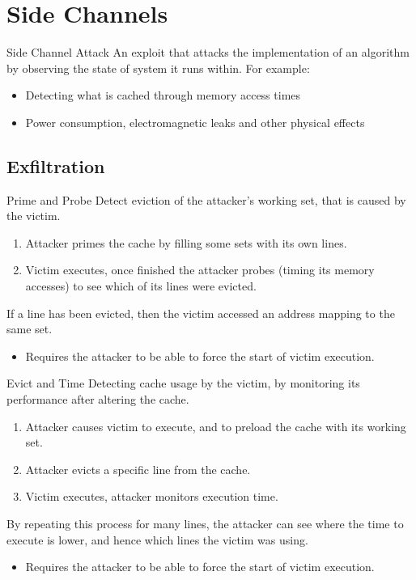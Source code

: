 \chapter{Side Channels}

\begin{definitionbox}{Side Channel Attack}
	An exploit that attacks the implementation of an algorithm by observing the state of system it runs within. For example:
	\begin{itemize}
		\item Detecting what is cached through memory access times
		\item Power consumption, electromagnetic leaks and other physical effects
	\end{itemize}
\end{definitionbox}

\section{Exfiltration}

\begin{definitionbox}{Prime and Probe}
	Detect eviction of the attacker's working set, that is caused by the victim.
	\begin{enumerate}
		\item Attacker primes the cache by filling some sets with its own lines.
		\item Victim executes, once finished the attacker probes (timing its memory accesses) to see which of its lines were evicted.
	\end{enumerate}
	If a line has been evicted, then the victim accessed an address mapping to the same set.
	\begin{itemize}
		\item Requires the attacker to be able to force the start of victim execution.
	\end{itemize}
\end{definitionbox}

\begin{definitionbox}{Evict and Time}
	Detecting cache usage by the victim, by monitoring its performance after altering the cache.
	\begin{enumerate}
		\item Attacker causes victim to execute, and to preload the cache with its working set.
		\item Attacker evicts a specific line from the cache.
		\item Victim executes, attacker monitors execution time.
	\end{enumerate}
	By repeating this process for many lines, the attacker can see where the time to execute is lower, and hence which lines the victim was using.
	\begin{itemize}
		\item Requires the attacker to be able to force the start of victim execution.
	\end{itemize}
\end{definitionbox}

